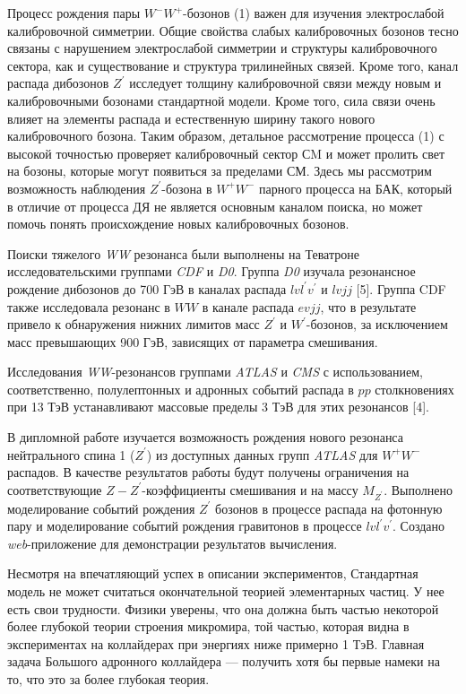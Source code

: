 Процесс рождения пары $W^-W^+$-бозонов (1) важен для изучения электрослабой калибровочной симметрии. Общие свойства слабых калибровочных бозонов тесно связаны с нарушением электрослабой симметрии и структуры калибровочного сектора, как и существование и структура трилинейных связей. Кроме того, канал распада дибозонов $Z^\prime$ исследует толщину калибровочной связи между новым и калибровочными бозонами стандартной модели. Кроме того, сила связи очень влияет на элементы распада и естественную ширину такого нового калибровочного бозона. Таким образом, детальное рассмотрение процесса (1) с высокой точностью проверяет калибровочный сектор СM и может пролить свет на бозоны, которые могут появиться за пределами СМ. Здесь мы рассмотрим возможность наблюдения $Z^\prime$-бозона в $W^+W^-$ парного процесса на БАК, который в отличие от процесса ДЯ не является основным каналом поиска, но может помочь понять происхождение новых калибровочных бозонов.

Поиски тяжелого \textit{WW} резонанса были выполнены на Теватроне исследовательскими группами \textit{CDF} и \textit{D0}. Группа \textit{D0} изучала резонансное рождение дибозонов до 700 ГэВ в каналах распада $lvl^\prime v^\prime$ и $lvjj$ [5]. Группа CDF также исследовала резонанс в $WW$ в канале распада $evjj$, что в результате привело к обнаружения нижних лимитов масс $Z^\prime$
и $W^\prime$-бозонов, за исключением масс превышающих 900 ГэВ, зависящих от параметра смешивания.

Исследования \textit{WW}-резонансов группами \textit{ATLAS} и \textit{CMS} с использованием, соответственно, полулептонных и адронных событий распада в $pp$ столкновениях при 13 ТэВ устанавливают массовые пределы 3 ТэВ для этих резонансов [4]. 

В дипломной работе изучается возможность рождения нового резонанса нейтрального спина 1 ($Z^\prime$) из доступных данных групп \textit{ATLAS} для $W^+W^-$ распадов. В качестве результатов работы будут получены ограничения на соответствующие $Z-Z^\prime$-коэффициенты смешивания и на массу $M_{Z^\prime}$.
Выполнено моделирование событий рождения $Z^\prime$ бозонов в процессе распада на фотонную пару и моделирование событий рождения гравитонов в процессе $lvl^\prime v^\prime$. Создано \textit{web}-приложение для демонстрации результатов вычисления.

Несмотря на впечатляющий успех в описании экспериментов, Стандартная модель не может считаться окончательной теорией элементарных частиц. У нее есть свои трудности. Физики уверены, что она должна быть частью некоторой более глубокой теории строения микромира, той частью, которая видна в экспериментах на коллайдерах при энергиях ниже примерно 1 ТэВ. Главная задача Большого адронного коллайдера — получить хотя бы первые намеки на то, что это за более глубокая теория.

